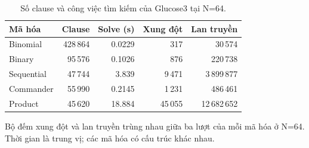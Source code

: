 \begin{table}[pos=H]
\centering
\small
\caption{Số clause và công việc tìm kiếm của Glucose3 tại N=64.}
\label{tab:counterexample}
\setlength{\tabcolsep}{4pt}
\begin{tabular}{@{}lrrrr@{}}
\toprule
Mã hóa & Clause & Solve (s) & Xung đột & Lan truyền \\
\midrule
Binomial & 428\,864 & 0.0229 & 317 & 30\,574 \\
Binary & 95\,576 & 0.1026 & 876 & 220\,738 \\
Sequential & 47\,744 & 3.839 & 9\,471 & 3\,899\,877 \\
Commander & 55\,990 & 0.2145 & 1\,231 & 486\,461 \\
Product & 45\,620 & 18.884 & 45\,055 & 12\,682\,652 \\
\bottomrule
\end{tabular}
\par\smallskip\begin{minipage}{\linewidth}\footnotesize Bộ đếm xung đột và lan truyền trùng nhau giữa ba lượt của mỗi mã hóa ở N=64. Thời gian là trung vị; các mã hóa có cấu trúc khác nhau.\end{minipage}
\end{table}
